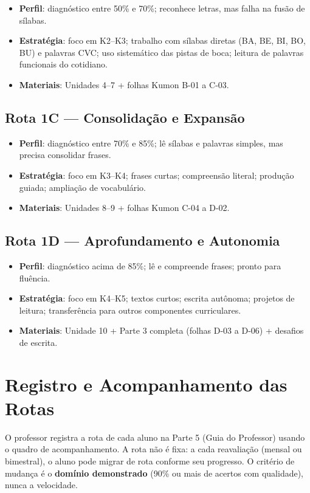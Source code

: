 \begin{itemize}
  \item \textbf{Perfil}: diagnóstico entre 50\% e 70\%; reconhece letras, mas falha na fusão de sílabas.
  \item \textbf{Estratégia}: foco em K2--K3; trabalho com sílabas diretas (BA, BE, BI, BO, BU) e palavras CVC; uso sistemático das pistas de boca; leitura de palavras funcionais do cotidiano.
  \item \textbf{Materiais}: Unidades 4--7 + folhas Kumon B-01 a C-03.
\end{itemize}

\subsection{Rota 1C --- Consolidação e Expansão}

\begin{itemize}
  \item \textbf{Perfil}: diagnóstico entre 70\% e 85\%; lê sílabas e palavras simples, mas precisa consolidar frases.
  \item \textbf{Estratégia}: foco em K3--K4; frases curtas; compreensão literal; produção guiada; ampliação de vocabulário.
  \item \textbf{Materiais}: Unidades 8--9 + folhas Kumon C-04 a D-02.
\end{itemize}

\subsection{Rota 1D --- Aprofundamento e Autonomia}

\begin{itemize}
  \item \textbf{Perfil}: diagnóstico acima de 85\%; lê e compreende frases; pronto para fluência.
  \item \textbf{Estratégia}: foco em K4--K5; textos curtos; escrita autônoma; projetos de leitura; transferência para outros componentes curriculares.
  \item \textbf{Materiais}: Unidade 10 + Parte 3 completa (folhas D-03 a D-06) + desafios de escrita.
\end{itemize}

\section{Registro e Acompanhamento das Rotas}

O professor registra a rota de cada aluno na Parte 5 (Guia do Professor) usando o quadro de acompanhamento. A rota não é fixa: a cada reavaliação (mensal ou bimestral), o aluno pode migrar de rota conforme seu progresso. O critério de mudança é o \textbf{domínio demonstrado} (90\% ou mais de acertos com qualidade), nunca a velocidade.


